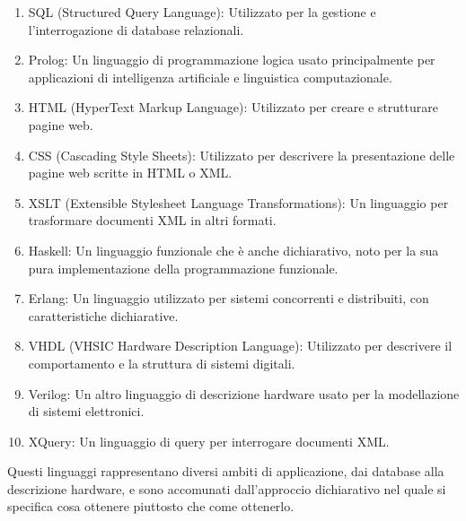 \documentclass[
  letterpaper,
]{scrbook}
\begin{document}
\begin{enumerate}
\def\labelenumi{\arabic{enumi}.}
\item
  SQL (Structured Query Language): Utilizzato per la gestione e
  l'interrogazione di database relazionali.
\item
  Prolog: Un linguaggio di programmazione logica usato principalmente
  per applicazioni di intelligenza artificiale e linguistica
  computazionale.
\item
  HTML (HyperText Markup Language): Utilizzato per creare e strutturare
  pagine web.
\item
  CSS (Cascading Style Sheets): Utilizzato per descrivere la
  presentazione delle pagine web scritte in HTML o XML.
\item
  XSLT (Extensible Stylesheet Language Transformations): Un linguaggio
  per trasformare documenti XML in altri formati.
\item
  Haskell: Un linguaggio funzionale che è anche dichiarativo, noto per
  la sua pura implementazione della programmazione funzionale.
\item
  Erlang: Un linguaggio utilizzato per sistemi concorrenti e
  distribuiti, con caratteristiche dichiarative.
\item
  VHDL (VHSIC Hardware Description Language): Utilizzato per descrivere
  il comportamento e la struttura di sistemi digitali.
\item
  Verilog: Un altro linguaggio di descrizione hardware usato per la
  modellazione di sistemi elettronici.
\item
  XQuery: Un linguaggio di query per interrogare documenti XML.
\end{enumerate}

Questi linguaggi rappresentano diversi ambiti di applicazione, dai
database alla descrizione hardware, e sono accomunati dall'approccio
dichiarativo nel quale si specifica cosa ottenere piuttosto che come
ottenerlo.
\end{document}
